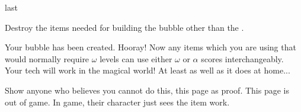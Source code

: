 \documentclass[greennotebook]{guildcamp3} %
\begin{document}
\begin{page}[at last...]{last}

Destroy the items needed for building the bubble other than the \iCauldron{}. 

Your bubble has been created. Hooray! Now any items which you are using that would normally require $\omega$ levels can use either $\omega$ or $\alpha$ scores interchangeably. Your tech will work in the magical world! At least as well as it does at home... 

Show anyone who believes you cannot do this, this page as proof. This page is out of game. In game, their character just sees the item work. 

\end{page}



\endnotebook
\end{document}
